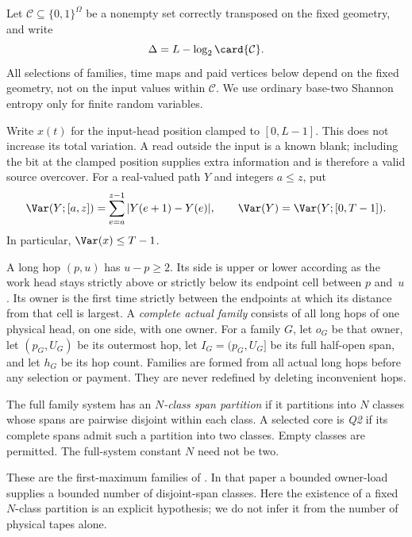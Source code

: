 Let $\mathcal C\subseteq\{0,1\}^{\Omega}$ be a nonempty set correctly
transposed on the fixed geometry, and write
\begin{equation}\label{eq:correctness-deficit}
 \Delta=L-\log_2\card{\mathcal C}.
\end{equation}
All selections of families, time maps and paid vertices below depend on
the fixed geometry, not on the input values within $\mathcal C$. We use
ordinary base-two Shannon entropy only for finite random variables.

Write $x(t)$ for the input-head position clamped to $[0,L-1]$. This does
not increase its total variation. A read outside the input is a known
blank; including the bit at the clamped position supplies extra
information and is therefore a valid source overcover. For a real-valued
path $Y$ and integers $a\le z$, put
\[
 \Var(Y;[a,z])=\sum_{e=a}^{z-1}|Y(e+1)-Y(e)|,
 \qquad \Var(Y)=\Var(Y;[0,T-1]).
\]
In particular, $\Var(x)\le T-1$.

\begin{definition}
\label{def:complete-families}
A long hop $(p,u)$ has $u-p\ge2$. Its side is upper or lower according
as the work head stays strictly above or strictly below its endpoint cell
between $p$ and~$u$. Its owner is the first time strictly between the
endpoints at which its distance from that cell is largest. A
\emph{complete actual family} consists of all long hops of one physical
head, on one side, with one owner. For a family $G$, let $o_G$ be that
owner, let $(p_G,U_G)$ be its outermost hop, let
$I_G=(p_G,U_G]$ be its full half-open span, and let $h_G$ be its hop count.
Families are formed from all actual long hops before any selection or
payment. They are never redefined by deleting inconvenient hops.

The full family system has an \emph{$N$-class span partition} if it
partitions into $N$ classes whose spans are pairwise disjoint within each
class. A selected core is \emph{Q2} if its complete spans admit such a
partition into two classes. Empty classes are permitted. The full-system
constant $N$ need not be two.
\end{definition}

These are the first-maximum families of
\cite[Sections~2.2 and~3.2]{EighthPaper2026}. In that paper a bounded
owner-load supplies a bounded number of disjoint-span classes. Here the
existence of a fixed $N$-class partition is an explicit hypothesis; we
do not infer it from the number of physical tapes alone.

